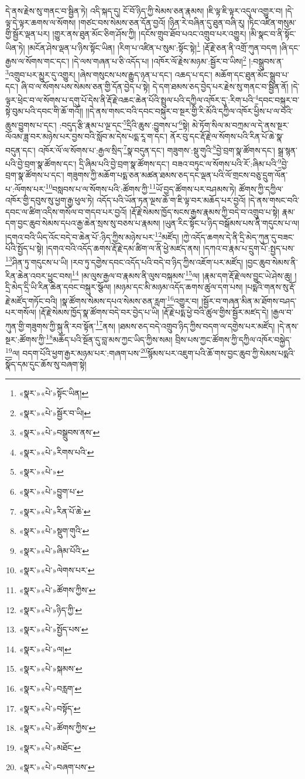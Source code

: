 དེ་ནས་རྗེས་སུ་གནང་བ་སྦྱིན་ཏེ། འདི་སྐད་དུ། ངོ་བོ་ཉིད་ཀྱི་སེམས་ཅན་རྣམས། །ཇི་ལྟ་ཇི་ལྟར་འདུལ་འགྱུར་བ། །དེ་ལྟ་དེ་ལྟར་ཆགས་ལ་སོགས། །གཙང་བས་སེམས་ཅན་དོན་བྱའོ། །ཉིན་རེ་བཞིན་དུ་ཐུན་བཞི་རུ། །ཏིང་འཛིན་གསུམ་གྱི་སྦྱོར་ལྡན་པར། །གྱུར་ནས་ཐུན་མོང་ཅིག་ཤོས་ཀྱི། །དངོས་གྲུབ་ཐོབ་པའང་འགྲུབ་པར་འགྱུར། །མི་སྣང་བ་ནི་སྟོང་ཡིན་ཏེ། །མངོན་ཤེས་ལྡན་པ་ཉིས་སྟོང་ཡིན། །རིག་པ་འཛིན་པ་སུམ་:སྟོང་སྟེ།\footnote{«སྣར་»«པེ་»སྟོང་ཡིན།} །རྡོ་རྗེ་ཅན་ནི་འགྲོ་ཀུན་བདག །ཞི་དང་རྒྱས་ལ་སོགས་གང་དང་། །དེ་ལས་གཞན་པ་ཅི་འདོད་པ། །འཁོར་ལོ་རྗེས་མཉམ་:སྦྱོར་བ་ཡིས།\footnote{«སྣར་»«པེ་»སྦྱོར་བ་ཡི།} །:བསྒྲུབས་ན་\footnote{«སྣར་»«པེ་»བསྒྲུབས་ནས་}འགྲུབ་པར་མྱུར་དུ་འགྱུར། །ཞེས་གསུངས་པས་རྒྱུད་ཉན་པ་དང་། འཆད་པ་དང་། མཆོག་དང་ཐུན་མོང་སྒྲུབ་པ་དང་། ཞི་བ་ལ་སོགས་པས་སེམས་ཅན་གྱི་དོན་བྱེད་པ་སྟེ། དེ་དག་ཐམས་ཅད་བྱེད་པར་རྗེས་སུ་གནང་བ་སྦྱིན་ནོ། །དེ་ལྟར་ཕྲེང་བ་ལ་སོགས་པ་དགུ་པོ་དེས་ནི་རྡོ་རྗེ་འཆང་ཆེན་པོའི་སྤྲུལ་པའི་དཀྱིལ་འཁོར་དུ་:རིག་པའི་\footnote{«སྣར་»«པེ་»རིགས་པའི་}དབང་བསྐུར་བ་སྟེ་བུམ་པའི་དབང་གི་ཆོ་གའོ།། །།དེ་ནས་གསང་བའི་དབང་བསྐུར་བ་སྔར་གྱི་རི་མོའི་དཀྱིལ་འཁོར་ཕྱིས་པ་ལ་བའི་ཆུས་བྱུགས་པ་དང་། :བདུད་རྩི་རྣམ་པ་ལྔ་དང་\footnote{«སྣར་»«པེ་»}དྲིའི་ཆུས་:བྱུགས་པ་\footnote{«སྣར་»«པེ་»བྱུག་པ་}སྟེ། མེ་ཏོག་སིལ་མ་བཀྲམ་ལ་དེ་ནས་སྔར་ལོའམ་ཟླ་བར་མཉེས་པར་བྱས་བའི་སློབ་མ་དེས་པདྨ་རཱ་ག་དང་། ནོར་བུ་དང་རྡོ་རྗེ་ལ་སོགས་པའི་རིན་པོ་ཆེ་སྣ་བདུན་དང་། འཁོར་ལོ་ལ་སོགས་པ་:རྒྱལ་སྲིད་\footnote{«སྣར་»«པེ་»རིན་པོ་ཆེ་}སྣ་བདུན་དང་། གཟུགས་:སྡུ་གུའི་\footnote{«སྣར་»«པེ་»སྡུག་གུའི་}བྱེ་བྲག་སྣ་ཚོགས་དང་། སྒྲ་སྙན་པའི་བྱེ་བྲག་སྣ་ཚོགས་དང་། དྲི་ཞིམ་པའི་བྱེ་བྲག་སྣ་ཚོགས་དང་། བཟའ་བཏུང་ལ་སོགས་པའི་རོ་:ཞིམ་པའི་\footnote{«སྣར་»«པེ་»ཞིམ་པོའི་}བྱེ་བྲག་སྣ་ཚོགས་པ་དང་། གཟུགས་ཀྱི་མཆོག་པདྨ་ཅན་མཚན་ཐམས་ཅད་དང་ལྡན་པའི་ལོ་གྲངས་བཅུ་དྲུག་ལོན་པ་:ལོགས་པར་\footnote{«སྣར་»«པེ་»ལེགས་པར་}བསླབས་པ་ལ་སོགས་པའི་:ཚོགས་ཀྱི་\footnote{«སྣར་»«པེ་»ཚོགས་ཀྱིས་}ཡོ་བྱད་ཚོགས་པར་བཤམས་ཏེ། ཚོགས་ཀྱི་དཀྱིལ་འཁོར་གྱི་དབུས་སུ་ཕྱག་རྒྱ་ཕུལ་ཏེ། འདོད་པའི་ཡོན་ཏན་ལྔས་ཆོ་ག་ཇི་ལྟ་བར་མཆོད་པར་བྱའོ། །དེ་ནས་གསང་བའི་དབང་ལ་ཚིག་འདིས་གསོལ་བ་གདབ་པར་བྱའོ། །རྡོ་རྗེ་སེམས་ཁྱོད་སངས་རྒྱས་རྣམས་ཀྱི་བདེ་བ་འགྲུབ་པ་སྟེ། རྣམ་དག་བྱང་ཆུབ་སེམས་དཔའ་རྒྱ་ཆེན་སྲས་སུ་བཅས་པ་རྣམས། །ཡུན་རིང་སྟོང་པ་ཉིད་བསྒོམས་པས་ནི་གདུངས་པ་ལ། །དགའ་བའི་ཡིད་འོང་བདེ་བ་ཆེན་པོ་:ཉིད་ཀྱིས་མཉེས་པར་\footnote{«སྣར་»«པེ་»ཉིད་ཀྱི་}མཛོད། །ཀྱེ་འདོད་ཆགས་དེ་ནི་དྲི་མེད་ཀུན་དུ་བཟང་པོའི་སྤྱོད་པ་སྟེ། །དགའ་བའི་འདོད་ཆགས་རྡོ་རྗེ་དམ་ཚིག་ལ་ནི་ཕྱེ་མཛད་ནས། །དཀའ་བ་རྣམ་པ་དྲུག་པོ་:སྤྱད་པས་\footnote{«སྣར་»«པེ་»སྤྱོད་པས་}ཤིན་ཏུ་གདུངས་པ་ཡི། །རབ་ཏུ་དགྱེས་དབང་འདོད་པའི་བདེ་བ་ཉིད་ཀྱིས་འཇོག་པར་མཛོད། །བྱང་ཆུབ་སེམས་ནི་རིན་ཆེན་འབར་ཕྱུང་བས།\footnote{«སྣར་»«པེ་»ལ།} །མ་ལུས་རྒྱལ་བ་རྣམས་ནི་ལུས་བསྐམས་\footnote{«སྣར་»«པེ་»སྐམས་}ལ། །རྣམ་དག་རྡོ་རྗེ་ལས་བྱུང་ཡེ་ཤེས་ཆུ། །དྲི་མེད་དྲི་ཡི་རིན་ཆེན་དབང་བསྐུར་སྩོལ། །མཉམ་དང་མི་མཉམ་འདོད་ཆགས་ཚུལ་དག་པས། །པདྨའི་གནས་སུ་རྡོ་རྗེ་མཛོད་གཏོང་བའི། །སྣ་ཚོགས་སེམས་དཔའ་སེམས་ཅན་རླག་\footnote{«སྣར་»«པེ་»བརླག་}འགྱུར་བ། །སྦྱོར་བ་གཞན་མིན་མ་ཐོགས་བཤད་པར་གསོལ། །རྡོ་རྗེ་སེམས་ཁྱོད་སྣ་ཚོགས་བདེ་བར་བྱེད་པ་ཡི། །རྡོ་རྗེ་པདྨ་ཕྱེ་བའི་ཚུལ་གྱིས་སྦྱོར་མཛད་དེ། །རྒྱལ་བ་ཀུན་གྱི་གཟུགས་ཀྱི་སྐུ་ནི་རབ་སྟོན་\footnote{«སྣར་»«པེ་»བསྟོད་}ནས། །ཐམས་ཅད་བདེ་འགྲུབ་ཉིད་ཀྱིས་བདག་ལ་དགྱེས་པར་མཛོད། །དེ་ནས་སྔར་:ཚོགས་ཀྱི་\footnote{«སྣར་»«པེ་»ཚོགས་ཀྱིས་}མཆོད་པའི་སྔོན་དུ་བླ་མས་ཀྱང་ཡིད་ཀྱིས་སམ། བྲིས་པས་ཀྱང་ཚོགས་ཀྱི་དཀྱིལ་འཁོར་བསྐྱེད་\footnote{«སྣར་»«པེ་»མཐོང་}ལ། བདག་པོའི་ཕྱག་རྒྱར་མཉམ་པར་:གཞག་པས་\footnote{«སྣར་»«པེ་»བཞག་པས་}སྙོམས་པར་འཇུག་པའི་ཆོ་གས་བྱང་ཆུབ་ཀྱི་སེམས་པདྨའི་སྣོད་དམ་དུང་ཆོས་སུ་བཞག་སྟེ། 